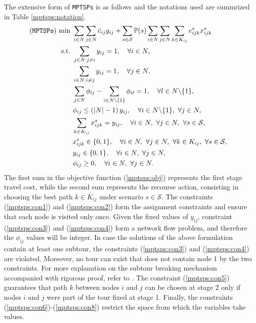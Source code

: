 The extensive form of \texttt{MPTSPs} is as follows and the notations used are summrized in Table \ref{mptsps:notation}.
\begin{subequations}
\begin{align}
(\texttt{MPTSPs})\ \textrm{min}\ &\sum_{i\in N}\sum_{j\in N}\bar{c}_{ij}y_{ij}+\sum_{s\in \mathcal{S}}\PP(s)\sum_{i\in N}\sum_{j\in N}\sum_{k\in K_{ij}}e_{ijk}^{s}x_{ijk}^{s} \label{mptsps:obj} \\ 
	\textrm{s.t.}\ &\sum_{j\in N:j\neq i}y_{ij}=1,\quad\forall i\in N, \label{mptsps:con1} \\ 
&\sum_{i\in N:i\neq j}y_{ij}=1,\quad\forall j\in N,\label{mptsps:con2} \\ 
&\sum_{j\in N}\phi_{lj}-\sum_{i\in N\backslash\{1\}}\phi_{il}=1,\quad\forall l\in N\backslash\{1\}, \label{mptsps:con3}  \\ 
&\phi_{ij}\le \left(|N|-1\right)y_{ij},\quad\forall i\in N\backslash\{1\},\ \forall j\in N,  \label{mptsps:con4} \\ 
&\sum_{k\in K_{ij}}x_{ijk}^{s}=y_{ij},\quad\forall i\in N,\ \forall j\in N,\ \forall s\in \mathcal{S}, \label{mptsps:con5} \\ 
&x_{ijk}^{s}\in\{0,1\},\quad\forall i\in N,\ \forall j\in N,\ \forall k\in K_{ij},\ \forall s\in \mathcal{S}, \label{mptsps:con6}  \\ 
&y_{ij}\in \{0,1\},\quad \forall i\in N,\ \forall j\in N, \label{mptsps:con7} \\ 
&\phi_{ij} \ge 0, \quad \forall i\in N,\ \forall j\in N. \label{mptsps:con8}
\end{align}
\end{subequations}
The first sum in the objective function (\ref{mptsps:obj}) represents the first stage travel cost, while the second sum represents the recourse action, consisting in choosing the best path $k\in K_{ij}$ under scenario $s\in\mathcal{S}$. The constraints (\ref{mptsps:con1}) and (\ref{mptsps:con2}) form the assignment constraints and ensure that each node is visited only once. Given the fixed values of $y_{ij}$, constraint (\ref{mptsps:con3}) and (\ref{mptsps:con4}) form a network flow problem, and therefore the $\phi_{ij}$ values will be integer. In case the solutions of the above formulation contain at least one subtour, the constraints (\ref{mptsps:con3}) and (\ref{mptsps:con4}) are violated. Moreover, no tour can exist that does not contain node 1 by the two constraints. For more explanation on the subtour breaking mechanism accompanied with rigorous proof, refer to \cite{journal:GG1978}. The constraint (\ref{mptsps:con5}) guarantees that path $k$ between nodes $i$ and $j$ can be chosen at stage 2 only if nodes $i$ and $j$ were part of the tour fixed at stage 1. Finally, the constraints (\ref{mptsps:con6})-(\ref{mptsps:con8}) restrict the space from which the variables take values.

